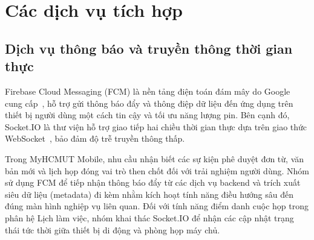 \section{Các dịch vụ tích hợp}
\subsection{Dịch vụ thông báo và truyền thông thời gian thực}
\label{subsec:backend_notification_realtime}

Firebase Cloud Messaging (FCM) là nền tảng điện toán đám mây do Google cung cấp~\cite{fcm_doc}, hỗ trợ gửi thông báo đẩy và thông điệp dữ liệu đến ứng dụng trên thiết bị người dùng một cách tin cậy và tối ưu năng lượng pin. Bên cạnh đó, Socket.IO là thư viện hỗ trợ giao tiếp hai chiều thời gian thực dựa trên giao thức WebSocket~\cite{socketio_doc}, bảo đảm độ trễ truyền thông thấp.

Trong MyHCMUT Mobile, nhu cầu nhận biết các sự kiện phê duyệt đơn từ, văn bản mới và lịch họp đóng vai trò then chốt đối với trải nghiệm người dùng. Nhóm sử dụng FCM để tiếp nhận thông báo đẩy từ các dịch vụ backend và trích xuất siêu dữ liệu (metadata) đi kèm nhằm kích hoạt tính năng điều hướng sâu đến đúng màn hình nghiệp vụ liên quan. Đối với tính năng điểm danh cuộc họp trong phân hệ Lịch làm việc, nhóm khai thác Socket.IO để nhận các cập nhật trạng thái tức thời giữa thiết bị di động và phòng họp máy chủ.